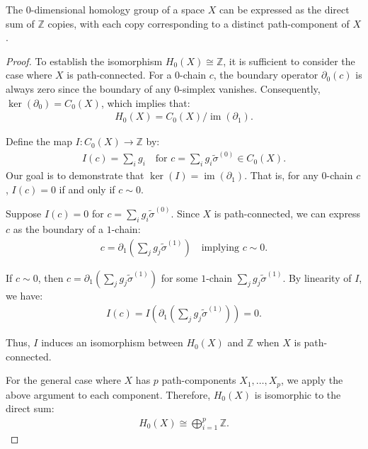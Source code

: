 \begin{proposition}
The \( 0 \)-dimensional homology group of a space \( X \) can be expressed as the direct sum of \(\mathbb{Z}\) copies, with each copy corresponding to a distinct path-component of \( X \).
\end{proposition}

\begin{proof}
To establish the isomorphism \( H_{0}(X) \cong \mathbb{Z} \), it is sufficient to consider the case where \( X \) is path-connected. For a \( 0 \)-chain \( c \), the boundary operator \( \partial_{0}(c) \) is always zero since the boundary of any \( 0 \)-simplex vanishes. Consequently, \( \ker(\partial_{0}) = C_{0}(X) \), which implies that:
\begin{align}
H_{0}(X) = C_{0}(X) / \operatorname{im}(\partial_{1}).
\end{align}

Define the map \( I: C_{0}(X) \to \mathbb{Z} \) by:
\begin{align}
I(c) = \sum_{i} g_{i} \quad \text{for } c = \sum_{i} g_{i} \tilde{\sigma}^{(0)} \in C_{0}(X).
\end{align}
Our goal is to demonstrate that \( \ker(I) = \operatorname{im}(\partial_{1}) \). That is, for any \( 0 \)-chain \( c \), \( I(c) = 0 \) if and only if \( c \sim 0 \).

Suppose \( I(c) = 0 \) for \( c = \sum_{i} g_{i} \tilde{\sigma}^{(0)} \). Since \( X \) is path-connected, we can express \( c \) as the boundary of a \( 1 \)-chain:
\begin{align}
c = \partial_{1} \left( \sum_{j} g_{j} \tilde{\sigma}^{(1)} \right) \quad \text{implying } c \sim 0.
\end{align}

If \( c \sim 0 \), then \( c = \partial_{1} \left( \sum_{j} g_{j} \tilde{\sigma}^{(1)} \right) \) for some \( 1 \)-chain \( \sum_{j} g_{j} \tilde{\sigma}^{(1)} \). By linearity of \( I \), we have:
\begin{align}
I(c) = I \left( \partial_{1} \left( \sum_{j} g_{j} \tilde{\sigma}^{(1)} \right) \right) = 0.
\end{align}

Thus, \( I \) induces an isomorphism between \( H_{0}(X) \) and \( \mathbb{Z} \) when \( X \) is path-connected.

For the general case where \( X \) has \( p \) path-components \( X_{1}, \ldots, X_{p} \), we apply the above argument to each component. Therefore, \( H_{0}(X) \) is isomorphic to the direct sum:
\begin{align}
H_{0}(X) \cong \bigoplus_{i=1}^{p} \mathbb{Z}.
\end{align}
\end{proof}


